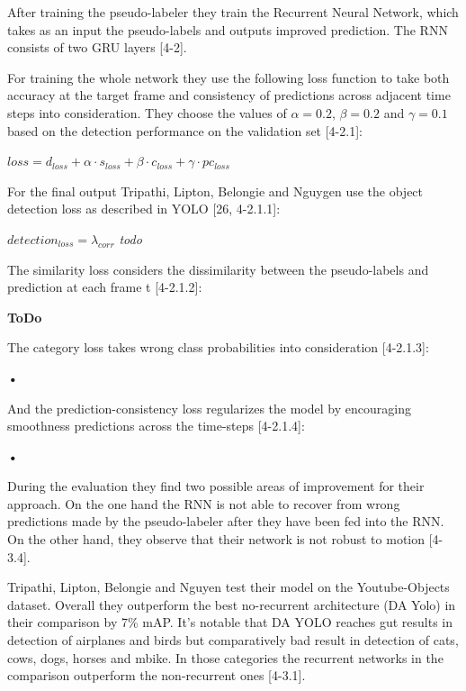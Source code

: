 \documentclass[conference]{IEEEtran}
\begin{document}
After training the pseudo-labeler they train the Recurrent Neural Network, which takes as an input the pseudo-labels and outputs improved prediction. The RNN consists of two GRU layers [4-2]. \newline

For training the whole network they use the following loss function to take both accuracy at the target frame and consistency of predictions across adjacent time steps into consideration. They choose the values of $\alpha = 0.2$, $\beta = 0.2$ and $\gamma = 0.1$ based on the detection performance on the validation set [4-2.1]: \newline

$ loss = d_{loss} + \alpha \cdot s_{loss} + \beta \cdot c_{loss} + \gamma \cdot pc_{loss} $ \newline

For the final output Tripathi, Lipton, Belongie and Nguygen use the object detection loss as described in YOLO [26, 4-2.1.1]: \newline

$ detection_{loss} = \lambda_{corr} $ \textit{todo}

The similarity loss considers the dissimilarity between the pseudo-labels and prediction at each frame t [4-2.1.2]: \newline

\textbf{ToDo}

The category loss takes wrong class probabilities into consideration [4-2.1.3]:  

\textbf{•}

And the prediction-consistency loss regularizes the model by encouraging smoothness predictions across the time-steps [4-2.1.4]:

\textbf{•}

During the evaluation they find two possible areas of improvement for their approach. On the one hand the RNN is not able to recover from wrong predictions made by the pseudo-labeler after they have been fed into the RNN.  On the other hand, they observe that their network is not robust to motion [4-3.4].

Tripathi, Lipton, Belongie and Nguyen test their model on the Youtube-Objects dataset. Overall they outperform the best no-recurrent architecture (DA Yolo) in their comparison by 7\% mAP. It's notable that DA YOLO reaches gut results in detection of airplanes and birds but comparatively bad result in detection of cats, cows, dogs, horses and mbike. In those categories the recurrent networks in the comparison outperform the non-recurrent ones [4-3.1]. \newline
\end{document}
